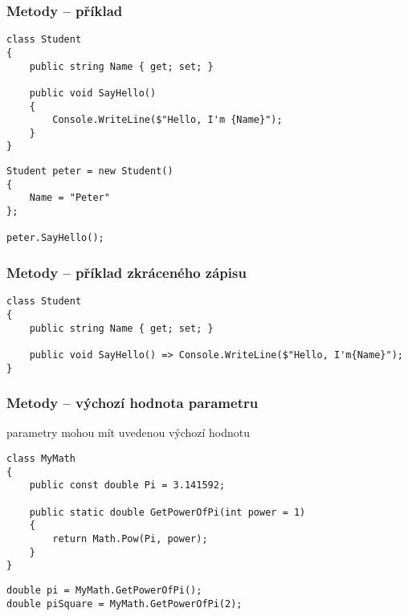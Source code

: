 \begin{frame}[fragile]
\frametitle{Metody -- příklad}
\vfill
\begin{yesblock}
\begin{lstlisting}[basicstyle=\small]
class Student
{
    public string Name { get; set; }

    public void SayHello()
    {
        Console.WriteLine($"Hello, I'm {Name}");
    }
}
\end{lstlisting}
\end{yesblock}
\vfill
\begin{yesblock}
\begin{lstlisting}[basicstyle=\small]
Student peter = new Student()
{
    Name = "Peter"
};

peter.SayHello();
\end{lstlisting}
\end{yesblock}
\vfill
\end{frame}




\begin{frame}[fragile]
\frametitle{Metody -- příklad zkráceného zápisu}
\vfill
\begin{yesblock}
\begin{lstlisting}[basicstyle=\small]
class Student
{
    public string Name { get; set; }

    public void SayHello() => Console.WriteLine($"Hello, I'm{Name}");
}
\end{lstlisting}
\end{yesblock}
\vfill
\end{frame}




\begin{frame}[fragile]
\frametitle{Metody -- výchozí hodnota parametru}
\begin{bitemize}{}
\item parametry mohou mít uvedenou výchozí hodnotu
\end{bitemize}
\vfill
\begin{yesblock}
\begin{lstlisting}[basicstyle=\small]
class MyMath
{
    public const double Pi = 3.141592;

    public static double GetPowerOfPi(int power = 1)
    {
        return Math.Pow(Pi, power);
    }
}
\end{lstlisting}
\end{yesblock}
\vfill
\begin{yesblock}
\begin{lstlisting}[basicstyle=\small]
double pi = MyMath.GetPowerOfPi();
double piSquare = MyMath.GetPowerOfPi(2);
\end{lstlisting}
\end{yesblock}
\end{frame}




